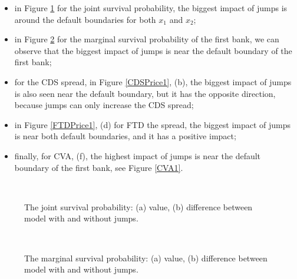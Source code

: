 \begin{itemize}
\item
in Figure \ref{jointSurvProb1} for the joint survival probability,
the biggest impact of jumps is around the default boundaries for both $x_1$ and $x_2$;
\item
in Figure \ref{marginalSurvProb1} for the marginal survival probability of the first bank,
we can observe that the biggest impact of jumps is near the default boundary of the first bank;
\item
for the CDS spread, in Figure \ref{CDSPrice1}, (b), the biggest impact of jumps is also seen near the default boundary, but it has the opposite direction, because jumps can only increase the CDS spread;
\item
in Figure \ref{FTDPrice1}, (d) for FTD the spread, the biggest impact of jumps is near both default boundaries, and it has a positive impact;
\item
finally, for CVA, (f), the highest impact of jumps is near the default boundary of the first bank, see Figure \ref{CVA1}.
\end{itemize}

\begin{figure}%
	\begin{center}
		\\
	\end{center}
	\vspace{-20pt}
	\caption{The joint survival probability: (a) value, (b) difference between model with and without jumps.}
 	\label{jointSurvProb1}
\end{figure}

 \begin{figure}%
	\begin{center}
		\\
	\end{center}
	\vspace{-20pt}
	\caption{The marginal survival probability: (a) value, (b)  difference between model with and without jumps.}
 	\label{marginalSurvProb1}
\end{figure}


